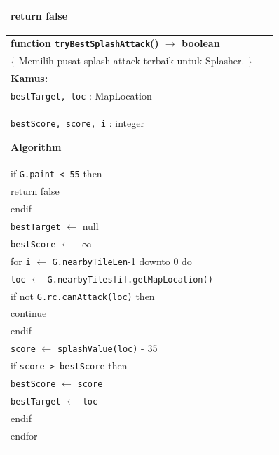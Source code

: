 \documentclass{article}
\newenvironment{pseudobox}
{
\centering
\begin{longtable}{|p{0.94\linewidth}|}
\hline
}
{
\\ \hline
\end{longtable}
\vspace{0.05cm}
}
\begin{document}
\begin{enumerate}[label=\alph*.]
\begin{enumerate}[label=\alph*.]
\begin{pseudobox}
\hspace*{1.5em}return false
\end{pseudobox}

\begin{pseudobox}
\textbf{function \texttt{tryBestSplashAttack}() $\rightarrow$ boolean} \\
\{ Memilih pusat splash attack terbaik untuk Splasher. \}\\

\textbf{Kamus:} \\
\hspace*{1.5em}\texttt{bestTarget, loc} : MapLocation \\
\hspace*{1.5em}\texttt{bestScore, score, i} : integer

\textbf{Algorithm} \\
\hspace*{1.5em}if \texttt{G.paint < 55} then \\
\hspace*{3em}return false \\
\hspace*{1.5em}endif \\

\hspace*{1.5em}\texttt{bestTarget} $\leftarrow$ null \\
\hspace*{1.5em}\texttt{bestScore} $\leftarrow -\infty$ \\

\hspace*{1.5em}for \texttt{i} $\leftarrow$ \texttt{G.nearbyTileLen}-1 downto 0 do \\
\hspace*{3em}\texttt{loc} $\leftarrow$ \texttt{G.nearbyTiles[i].getMapLocation()} \\

\hspace*{3em}if not \texttt{G.rc.canAttack(loc)} then \\
\hspace*{4.5em}continue \\
\hspace*{3em}endif \\

\hspace*{3em}\texttt{score} $\leftarrow$ \texttt{splashValue(loc)} - 35 \\

\hspace*{3em}if \texttt{score > bestScore} then \\
\hspace*{4.5em}\texttt{bestScore} $\leftarrow$ \texttt{score} \\
\hspace*{4.5em}\texttt{bestTarget} $\leftarrow$ \texttt{loc} \\
\hspace*{3em}endif \\
\hspace*{1.5em}endfor \\


\end{pseudobox}
\end{enumerate}
\end{enumerate}
\end{document}
